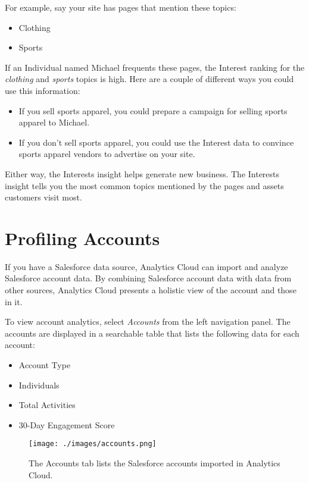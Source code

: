 For example, say your site has pages that mention these topics:

\begin{itemize}
\tightlist
\item
  Clothing
\item
  Sports
\end{itemize}

If an Individual named Michael frequents these pages, the Interest
ranking for the \emph{clothing} and \emph{sports} topics is high. Here
are a couple of different ways you could use this information:

\begin{itemize}
\item
  If you sell sports apparel, you could prepare a campaign for selling
  sports apparel to Michael.
\item
  If you don't sell sports apparel, you could use the Interest data to
  convince sports apparel vendors to advertise on your site.
\end{itemize}

Either way, the Interests insight helps generate new business. The
Interests insight tells you the most common topics mentioned by the
pages and assets customers visit most.

\section{Profiling Accounts}\label{profiling-accounts}

If you have a Salesforce data source, Analytics Cloud can import and
analyze Salesforce account data. By combining Salesforce account data
with data from other sources, Analytics Cloud presents a holistic view
of the account and those in it.

To view account analytics, select \emph{Accounts} from the left
navigation panel. The accounts are displayed in a searchable table that
lists the following data for each account:

\begin{itemize}
\tightlist
\item
  Account Type
\item
  Individuals
\item
  Total Activities
\item
  30-Day Engagement Score
\end{itemize}

\begin{figure}
\centering
\texttt{[image: ./images/accounts.png]}
\caption{The Accounts tab lists the Salesforce accounts imported in
Analytics Cloud.}
\end{figure}

